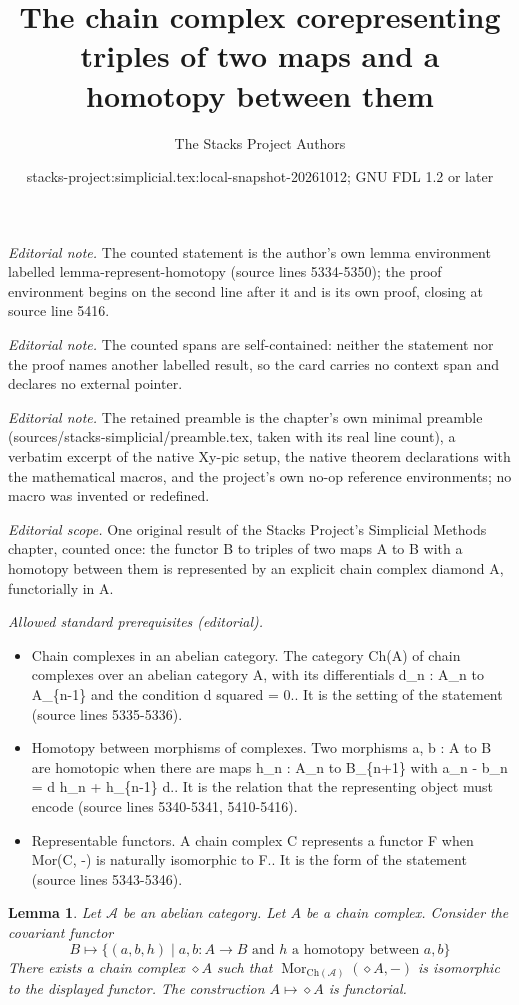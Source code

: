 \documentclass{stacks-project}
\title{The chain complex corepresenting triples of two maps and a homotopy between them}
\author{The Stacks Project Authors}
\date{stacks-project:simplicial.tex:local-snapshot-20261012; GNU FDL 1.2 or later}
\theoremstyle{plain}
\newtheorem{lemma}[subsection]{Lemma}
\theoremstyle{definition}
\theoremstyle{remark}
\numberwithin{equation}{subsection}
\def\Mor{\mathop{\mathrm{Mor}}\nolimits}
\begin{document}
\maketitle
\noindent\textit{Editorial note.} The counted statement is the author's own lemma environment labelled lemma-represent-homotopy (source lines 5334-5350); the proof environment begins on the second line after it and is its own proof, closing at source line 5416.\par\medskip
\noindent\textit{Editorial note.} The counted spans are self-contained: neither the statement nor the proof names another labelled result, so the card carries no context span and declares no external pointer.\par\medskip
\noindent\textit{Editorial note.} The retained preamble is the chapter's own minimal preamble (sources/stacks-simplicial/preamble.tex, taken with its real line count), a verbatim excerpt of the native Xy-pic setup, the native theorem declarations with the mathematical macros, and the project's own no-op reference environments; no macro was invented or redefined.\par\medskip
\noindent\textit{Editorial scope.} One original result of the Stacks Project's Simplicial Methods chapter, counted once: the functor B to triples of two maps A to B with a homotopy between them is represented by an explicit chain complex diamond A, functorially in A.\par\medskip
\noindent\textit{Allowed standard prerequisites (editorial).}\begin{itemize}
\item Chain complexes in an abelian category. The category Ch(A) of chain complexes over an abelian category A, with its differentials d\_n : A\_n to A\_\{n-1\} and the condition d squared = 0.. It is the setting of the statement (source lines 5335-5336).
\item Homotopy between morphisms of complexes. Two morphisms a, b : A to B are homotopic when there are maps h\_n : A\_n to B\_\{n+1\} with a\_n - b\_n = d h\_n + h\_\{n-1\} d.. It is the relation that the representing object must encode (source lines 5340-5341, 5410-5416).
\item Representable functors. A chain complex C represents a functor F when Mor(C, -) is naturally isomorphic to F.. It is the form of the statement (source lines 5343-5346).
\end{itemize}\medskip
\begin{lemma}
\label{lemma-represent-homotopy}
Let $\mathcal{A}$ be an abelian category. Let $A$ be a chain complex.
Consider the covariant functor
$$
B \longmapsto
\{
(a, b, h)
\mid
a, b : A \to B\text{ and }h\text{ a homotopy between }a, b
\}
$$
There exists a chain complex $\diamond A$
such that $\Mor_{\text{Ch}(\mathcal{A})}(\diamond A, -)$
is isomorphic to the displayed functor.
The construction $A \mapsto \diamond A$ is functorial.
\end{lemma}
\end{document}
